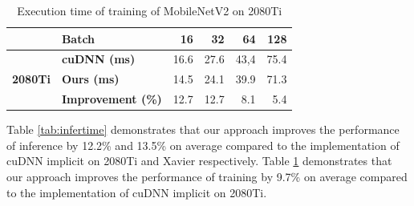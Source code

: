 \begin{table}[]

    \caption{Execution time of training of MobileNetV2 on 2080Ti}
    \label{tab:traintime}
    \centering
    \begin{threeparttable}
    \begin{tabular}{c|l|rrrr}
    \toprule
    &\textbf{Batch} & 16& 32 &64 & 128\\
    \midrule
    \multirow{3}{*}{\textbf{2080Ti}}&\textbf{cuDNN (ms)} & 16.6 & 27.6 & 43,4 &75.4 \\
    &\textbf{Ours (ms)} & 14.5  &24.1 &39.9 &71.3\\
    &\textbf{Improvement (\%)} &12.7  &12.7 &8.1 &5.4 \\
    \bottomrule
    \end{tabular}
    \footnotesize
    \end{threeparttable}
    \vspace{-5mm}
\end{table}
Table \ref{tab:infertime} demonstrates that our approach improves the performance of inference by 12.2\% and 13.5\% on average compared to the implementation of cuDNN implicit on 2080Ti and Xavier respectively. Table \ref{tab:traintime} demonstrates that our approach improves the performance of training by 9.7\% on average compared to the implementation of cuDNN implicit on 2080Ti.











